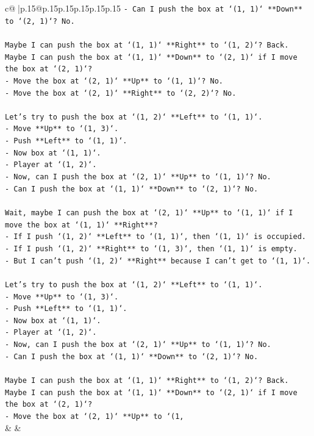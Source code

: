 \documentclass{article}
\begin{document}
{\begin{supertabular}{c@{$\;$}|p{.15\linewidth}@{}p{.15\linewidth}p{.15\linewidth}p{.15\linewidth}p{.15\linewidth}p{.15\linewidth}}
{{{\texttt{{-} Can I push the box at `(1, 1)` **Down** to `(2, 1)`? No.} \\
\\ 
\texttt{Maybe I can push the box at `(1, 1)` **Right** to `(1, 2)`? Back.} \\
\texttt{Maybe I can push the box at `(1, 1)` **Down** to `(2, 1)` if I move the box at `(2, 1)`?} \\
\texttt{{-} Move the box at `(2, 1)` **Up** to `(1, 1)`? No.} \\
\texttt{{-} Move the box at `(2, 1)` **Right** to `(2, 2)`? No.} \\
\\ 
\texttt{Let's try to push the box at `(1, 2)` **Left** to `(1, 1)`.} \\
\texttt{{-} Move **Up** to `(1, 3)`.} \\
\texttt{{-} Push **Left** to `(1, 1)`.} \\
\texttt{{-} Now box at `(1, 1)`.} \\
\texttt{{-} Player at `(1, 2)`.} \\
\texttt{{-} Now, can I push the box at `(2, 1)` **Up** to `(1, 1)`? No.} \\
\texttt{{-} Can I push the box at `(1, 1)` **Down** to `(2, 1)`? No.} \\
\\ 
\texttt{Wait, maybe I can push the box at `(2, 1)` **Up** to `(1, 1)` if I move the box at `(1, 1)` **Right**?} \\
\texttt{{-} If I push `(1, 2)` **Left** to `(1, 1)`, then `(1, 1)` is occupied.} \\
\texttt{{-} If I push `(1, 2)` **Right** to `(1, 3)`, then `(1, 1)` is empty.} \\
\texttt{{-} But I can't push `(1, 2)` **Right** because I can't get to `(1, 1)`.} \\
\\ 
\texttt{Let's try to push the box at `(1, 2)` **Left** to `(1, 1)`.} \\
\texttt{{-} Move **Up** to `(1, 3)`.} \\
\texttt{{-} Push **Left** to `(1, 1)`.} \\
\texttt{{-} Now box at `(1, 1)`.} \\
\texttt{{-} Player at `(1, 2)`.} \\
\texttt{{-} Now, can I push the box at `(2, 1)` **Up** to `(1, 1)`? No.} \\
\texttt{{-} Can I push the box at `(1, 1)` **Down** to `(2, 1)`? No.} \\
\\ 
\texttt{Maybe I can push the box at `(1, 1)` **Right** to `(1, 2)`? Back.} \\
\texttt{Maybe I can push the box at `(1, 1)` **Down** to `(2, 1)` if I move the box at `(2, 1)`?} \\
\texttt{{-} Move the box at `(2, 1)` **Up** to `(1,} \\
            }
        }
    }
    & & \\ \\


\end{supertabular}}
\end{document}
